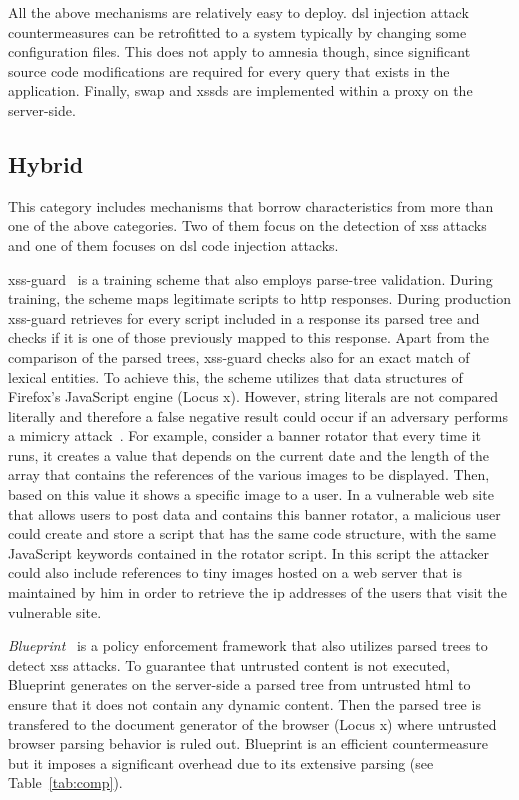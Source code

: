 \documentclass[conference]{IEEEtran}
\begin{document}
All the above mechanisms are relatively easy to deploy.
{\sc dsl} injection attack countermeasures
can be retrofitted to a system typically by changing
some configuration files. This does not apply
to {\sc amnesia} though, since significant source code
modifications are required for every query that exists
in the application. Finally, {\sc swap} and {\sc xssds}
are implemented within a proxy on the server-side.

\subsection{Hybrid}
\label{sec:hybrid}

This category includes mechanisms that borrow
characteristics from more than one of the above categories.
Two of them focus on the detection of {\sc xss}
attacks and one of them focuses on {\sc dsl} code
injection attacks.

{\sc xss-guard}~\cite{BV08} is a training scheme that also employs
parse-tree validation. During training, the scheme maps legitimate
scripts to {\sc http} responses. During production {\sc xss-guard}
retrieves for every script included in a response its parsed tree and
checks if it is one of those previously mapped to this response. Apart
from the comparison of the parsed trees, {\sc xss-guard} checks also
for an exact match of lexical entities. To achieve this, the scheme
utilizes that data structures of Firefox's JavaScript engine (Locus
{\sc x}). However, string literals are not compared literally and
therefore a false negative result could occur if an adversary performs
a mimicry attack~\cite{WS02}. For example, consider a banner rotator
that every time it runs, it creates a value that depends on the
current date and the length of the array that contains the references
of the various images to be displayed. Then, based on this value it
shows a specific image to a user. In a vulnerable web site that allows
users to post data and contains this banner rotator, a malicious user
could create and store a script that has the same code structure, with
the same JavaScript keywords contained in the rotator script.
In this script the attacker could also include references to tiny
images hosted on a web server that is maintained by him in order to
retrieve the {\sc ip} addresses of the users that visit the vulnerable
site.

{\it Blueprint}~\cite{LV09} is a policy enforcement framework that
also utilizes parsed trees to detect {\sc xss} attacks. To guarantee
that untrusted content is not executed, Blueprint generates on the
server-side a parsed tree from untrusted {\sc html} to ensure that it
does not contain any dynamic content. Then the parsed tree is
transfered to the document generator of the browser (Locus {\sc x})
where untrusted browser parsing behavior is ruled out. Blueprint is an
efficient countermeasure but it imposes a significant overhead due to
its extensive parsing (see Table~\ref{tab:comp}).
\end{document}

